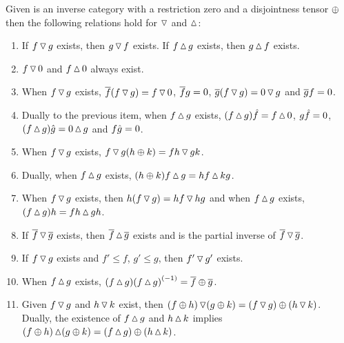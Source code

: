 \begin{lemma}\label{lem:properties_of_tjdown_and_tjup}
  Given \X is an inverse category with a restriction zero and a disjointness tensor $\+$ then the
  following relations hold for $\tjdown$ and $\tjup$:
   \begin{enumerate}[{(}i{)}]
    \item If $f \tjdown g$ exists, then $g \tjdown f$ exists. If $f \tjup g$ exists, then
    $g \tjup f$ exists. \label{lemitem:l_r_commute}
    \item $f \tjdown 0$ and $f \tjup 0$ always exist. \label{lemitem:l_r_zero_exists}
    \item When $f\tjdown g$ exists, $\rst{f}(f\tjdown g) = f \tjdown 0$, $\rst{f}g = 0$,
      $\rst{g}(f \tjdown g) = 0 \tjdown g$ and $\rst{g}f = 0$.
      \label{lemitem:l_r_rst_orthogonal_to_zero}
    \item Dually to the previous item, when $f\tjup g$ exists,
      $(f\tjup g)\rg{f} = f \tjup 0$, $g\rg{f} = 0$, $(f \tjup g)\rg{g} = 0 \tjup g$ and
      $f\rg{g} = 0$.\label{lemitem:l_r_rg_orthogonal_to_zero}
    \item When $f\tjdown g$ exists, $f\tjdown g (h\+k) = f h \tjdown g k$.
      \label{lemitem:l_r_l_pull_right}
    \item Dually, when $f \tjup g$ exists, $(h \+ k) f \tjup g = h f \tjup k g$.
      \label{lemitem:l_r_r_pull_left}
    \item When $f \tjdown g$ exists, then $h(f \tjdown g) = h f \tjdown hg$ and when $f \tjup g$
      exists, $(f \tjup g)h = f h \tjup g h$.
      \label{lemitem:l_r_l_universal_r_stable}
    \item If $\rst{f} \tjdown \rst{g}$ exists, then $\rst{f} \tjup \rst{g}$ exists and is
      the partial inverse of $\rst{f} \tjdown \rst{g}$.
      \label{lemitem:l_r_rst_inverses}
    \item If $f\tjdown g$ exists and $f' \le f$, $g' \le g$, then $f' \tjdown g'$ exists.
      \label{lemitem:l_r_less_than}
    \item When $f\tjup g$ exists, $(f\tjup g) \inv{(f\tjup g)} = \rst{f}\+\rst{g}$.
      \label{lemitem:l_r_rst_is_natural}
    \item Given $f\tjdown g$ and $h\tjdown k$ exist, then
      $(f\+h)\tjdown(g\+k) = (f\tjdown g)\+ (h\tjdown k)$. Dually, the existence of $f\tjup g$
      and $h\tjup k$ implies $(f\+h)\tjup(g\+k) = (f\tjup g)\+ (h\tjup k)$.
      \label{lemitem:l_r_preserve_tensor}
  \end{enumerate}
\end{lemma}
